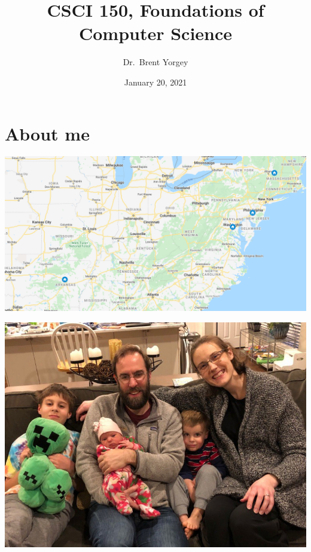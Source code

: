 \documentclass[xcolor={usenames,dvipsnames,svgnames,table},12pt]{beamer}
\title{CSCI 150, Foundations of Computer Science}
\date{January 20, 2021}
\author{Dr.\ Brent Yorgey}
\begin{document}
\maketitle

\section{About me}

\begin{frame}{}
  \begin{center}
    \includegraphics[width=\textwidth]{homes.png}
  \end{center}
\end{frame}

\begin{frame}{}
  \begin{center}
    \includegraphics[width=\textwidth]{family-cropped.jpg}
  \end{center}
\end{frame}
\end{document}
